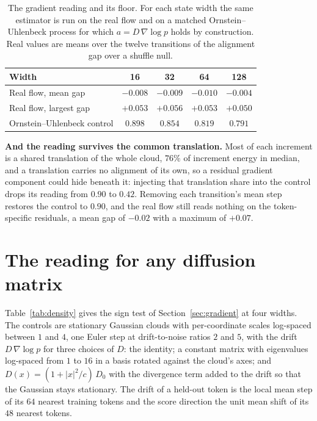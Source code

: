 \documentclass[mlmain]{jmlr}
\begin{document}
\begin{table}[htbp]
\centering
\caption{The gradient reading and its floor. For each state width the
same estimator is run on the real flow and on a matched
Ornstein--Uhlenbeck process for which $a = D\,\nabla\log p$ holds by
construction. Real values are means over the twelve transitions of the
alignment gap over a shuffle null.}
\label{tab:grad}
\small
\begin{tabular}{lcccc}
\toprule
Width & 16 & 32 & 64 & 128 \\
\midrule
Real flow, mean gap        & $-0.008$ & $-0.009$ & $-0.010$ & $-0.004$ \\
Real flow, largest gap     & $+0.053$ & $+0.056$ & $+0.053$ & $+0.050$ \\
Ornstein--Uhlenbeck control & $0.898$ & $0.854$ & $0.819$ & $0.791$ \\
\bottomrule
\end{tabular}
\end{table}

\textbf{And the reading survives the common translation.} Most of each
increment is a shared translation of the whole cloud, $76\%$ of
increment energy in median, and a translation carries no alignment of
its own, so a residual gradient component could hide beneath it:
injecting that translation share into the control drops its reading
from $0.90$ to $0.42$. Removing each transition's mean step restores
the control to $0.90$, and the real flow still reads nothing on the
token-specific residuals, a mean gap of $-0.02$ with a maximum of
$+0.07$.

\section{The reading for any diffusion matrix}
\label{app:density}
Table~\ref{tab:density} gives the sign test of
Section~\ref{sec:gradient} at four widths. The controls are stationary
Gaussian clouds with per-coordinate scales log-spaced between $1$ and
$4$, one Euler step at drift-to-noise ratios $2$ and $5$, with the drift
$D\,\nabla\log p$ for three choices of $D$: the identity; a constant
matrix with eigenvalues log-spaced from $1$ to $16$ in a basis rotated
against the cloud's axes; and $D(x) = (1 + |x|^2/c)\,D_0$ with the
divergence term added to the drift so that the Gaussian stays
stationary. The drift of a held-out token is the local mean step of its
$64$ nearest training tokens and the score direction the unit mean shift
of its $48$ nearest tokens.
\end{document}
